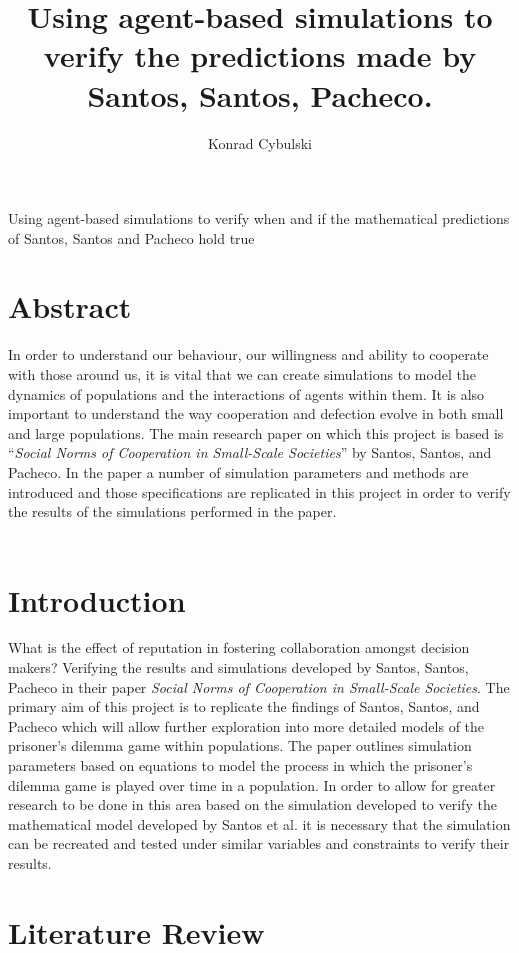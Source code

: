 \documentclass[10pt,a4paper]{article}
\author{Konrad Cybulski}
\title{Using agent-based simulations to verify the predictions made by Santos, Santos, Pacheco.}
\begin{document}
\begin{Large}
Using agent-based simulations to verify when and if the mathematical predictions of
Santos, Santos and Pacheco hold true
\end{Large}

\pagebreak
\tableofcontents
\pagebreak

\section{Abstract}
In order to understand our behaviour, our willingness and ability to cooperate with those around us, it is vital that we can create simulations to model the dynamics of populations and the interactions of agents within them.
It is also important to understand the way cooperation and defection evolve in both small and large populations.
The main research paper on which this project is based is “\textit{Social Norms of Cooperation in Small-Scale Societies}” by Santos, Santos, and Pacheco. 
In the paper a number of simulation parameters and methods are introduced and those specifications are replicated in this project in order to verify the results of the simulations performed in the paper.
\\\\
\section{Introduction}
What is the effect of reputation in fostering collaboration amongst decision makers? Verifying the results and simulations developed by Santos, Santos, Pacheco in their paper \textit{Social Norms of Cooperation in Small-Scale Societies}.
The primary aim of this project is to replicate the findings of Santos, Santos, and Pacheco which will allow further exploration into more detailed models of the prisoner’s dilemma game within populations. The paper outlines simulation parameters based on equations to model the process in which the prisoner’s dilemma game is played over time in a population. In order to allow for greater research to be done in this area based on the simulation developed to verify the mathematical model developed by Santos et al. it is necessary that the simulation can be recreated and tested under similar variables and constraints to verify their results.
\section{Literature Review}
\end{document}
